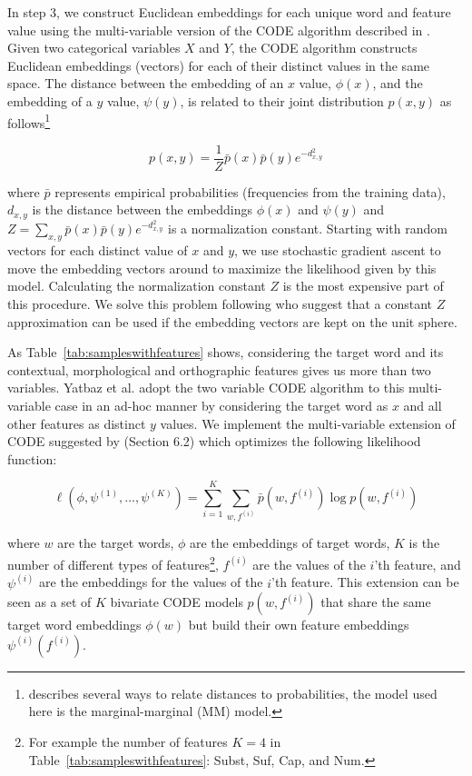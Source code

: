 In step 3, we construct Euclidean embeddings for each unique word and
feature value using the multi-variable version of the CODE algorithm
described in \cite{globerson2007euclidean}.  Given two categorical
variables $X$ and $Y$, the CODE algorithm constructs Euclidean
embeddings (vectors) for each of their distinct values in the same
space.  The distance between the embedding of an $x$ value, $\phi(x)$,
and the embedding of a $y$ value, $\psi(y)$, is related to their joint
distribution $p(x, y)$ as
follows\footnote{\cite{globerson2007euclidean} describes several ways
  to relate distances to probabilities, the model used here is the
  marginal-marginal (MM) model.}

\[ p(x,y) = \frac{1}{Z} \bar{p}(x) \bar{p}(y) e^{-d^2_{x,y}} \]

\noindent where $\bar{p}$ represents empirical probabilities
(frequencies from the training data), $d_{x,y}$ is the distance
between the embeddings $\phi(x)$ and $\psi(y)$ and $Z=\sum_{x,y}
\bar{p}(x) \bar{p}(y) e^{-d^2_{x,y}}$ is a normalization constant.
Starting with random vectors for each distinct value of $x$ and $y$,
we use stochastic gradient ascent to move the embedding vectors around
to maximize the likelihood given by this model.  Calculating the
normalization constant $Z$ is the most expensive part of this
procedure.  We solve this problem following \cite{maron2010sphere} who
suggest that a constant $Z$ approximation can be used if the embedding
vectors are kept on the unit sphere.

As Table~\ref{tab:sampleswithfeatures} shows, considering the target
word and its contextual, morphological and orthographic features gives
us more than two variables.  Yatbaz et al. 
 adopt the two
variable CODE algorithm to this multi-variable case in an ad-hoc
manner by considering the target word as $x$ and all other features as
distinct $y$ values.  We implement the multi-variable extension of
CODE suggested by \cite{globerson2007euclidean} (Section 6.2) which
optimizes the following likelihood function:

\[ \ell(\phi, \psi^{(1)}, \ldots, \psi^{(K)}) = 
    \sum_{i=1}^K \sum_{w,f^{(i)}} \bar{p}(w,f^{(i)}) \log p(w,f^{(i)}) \]

\noindent where $w$ are the target words, $\phi$ are the embeddings of
target words, $K$ is the number of different types of
features\footnote{For example the number of features $K=4$ in
  Table~\ref{tab:sampleswithfeatures}: Subst, Suf, Cap, and Num.},
$f^{(i)}$ are the values of the $i$'th feature, and $\psi^{(i)}$ are
the embeddings for the values of the $i$'th feature.  This extension
can be seen as a set of $K$ bivariate CODE models $p(w,f^{(i)})$ that
share the same target word embeddings $\phi(w)$ but build their own
feature embeddings $\psi^{(i)}(f^{(i)})$.


